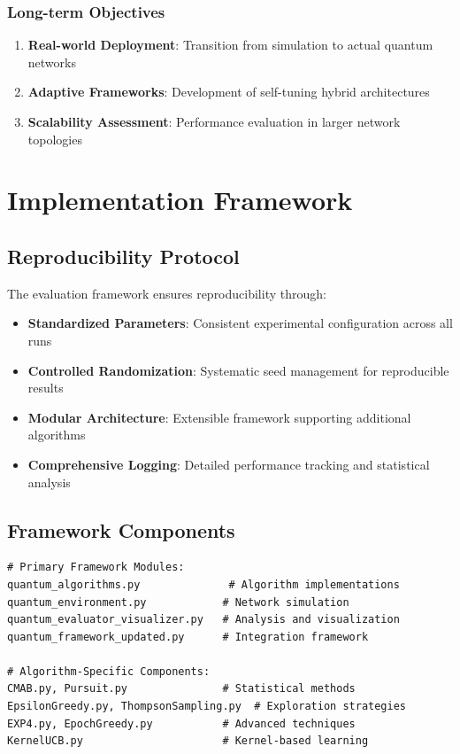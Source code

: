 \documentclass[12pt,a4paper]{article}
\begin{document}
\subsubsection{Long-term Objectives}
\begin{enumerate}
\item \textbf{Real-world Deployment}: Transition from simulation to actual quantum networks
\item \textbf{Adaptive Frameworks}: Development of self-tuning hybrid architectures
\item \textbf{Scalability Assessment}: Performance evaluation in larger network topologies
\end{enumerate}

\section{Implementation Framework}

\subsection{Reproducibility Protocol}

The evaluation framework ensures reproducibility through:

\begin{itemize}
\item \textbf{Standardized Parameters}: Consistent experimental configuration across all runs
\item \textbf{Controlled Randomization}: Systematic seed management for reproducible results
\item \textbf{Modular Architecture}: Extensible framework supporting additional algorithms
\item \textbf{Comprehensive Logging}: Detailed performance tracking and statistical analysis
\end{itemize}

\subsection{Framework Components}

\begin{lstlisting}[caption=Core Implementation Architecture]
# Primary Framework Modules:
quantum_algorithms.py              # Algorithm implementations
quantum_environment.py            # Network simulation
quantum_evaluator_visualizer.py   # Analysis and visualization
quantum_framework_updated.py      # Integration framework

# Algorithm-Specific Components:
CMAB.py, Pursuit.py               # Statistical methods
EpsilonGreedy.py, ThompsonSampling.py  # Exploration strategies
EXP4.py, EpochGreedy.py           # Advanced techniques
KernelUCB.py                      # Kernel-based learning
\end{lstlisting}
\end{document}
